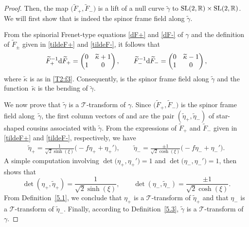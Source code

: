 \documentclass[pdftex]{sigma}
\numberwithin{equation}{section}
\def\bending{\kappa}
\def\R{\mathbb{R}}
\def\SL{{\rm SL}(2,\R)}
\begin{document}
\begin{proof}
	Then, the map $\bigl(\widetilde{F}_+,\widetilde{F}_-\bigr)$ is a lift of a null curve $\widetilde{\gamma}$ to $\SL\times\SL$. We will first show that  is indeed the spinor frame field along $\widetilde{\gamma}$.
	
	From the spinorial Frenet-type equations \eqref{dF+} and \eqref{dF-} of $\gamma$ and the definition of $\widetilde{F}_\pm$ given in \eqref{tildeF+} and \eqref{tildeF-}, it follows that
	\begin{gather*}
		\widetilde{F}_+^{-1}{\rm d}\widetilde{F}_+=\begin{pmatrix} 0 & \widetilde{\bending}+1 \\ 1 & 0 \end{pmatrix},\qquad
		\widetilde{F}_-^{-1}{\rm d}\widetilde{F}_-=\begin{pmatrix} 0 & \widetilde{\bending}-1 \\ 1 & 0 \end{pmatrix},
	\end{gather*}
	where $\widetilde{\bending}$ is as in \eqref{T2:f3}. Consequently,  is the spinor frame field along $\widetilde{\gamma}$ and the function~$\widetilde{\bending}$ is the bending of $\widetilde{\gamma}$.
	
	We now prove that $\widetilde{\gamma}$ is a $\mathcal{T}$-transform of $\gamma$. Since $\bigl(\widetilde{F}_+,\widetilde{F}_-\bigr)$ is the spinor frame field along~$\widetilde{\gamma}$, the first column vectors of  and  are the pair $(\widetilde{\eta}_+,\widetilde{\eta}_-)$ of star-shaped cousins associated with $\widetilde{\gamma}$. From the expressions of $\widetilde{F}_+$ and $\widetilde{F}_-$ given in \eqref{tildeF+} and \eqref{tildeF-}, respectively, we have
	\begin{gather*}
		\widetilde{\eta}_+=\frac{1}{\sqrt{2} \sinh(\xi)}\bigl(-f\eta_++\eta_+'\bigr),\qquad
		\widetilde{\eta}_-=\frac{\pm 1}{\sqrt{2} \cosh(\xi)}\bigl(-f\eta_-+\eta_-'\bigr).
	\end{gather*}
	A simple computation involving $\det \bigl(\eta_+,\eta_+'\bigr)=1$ and $\det \bigl(\eta_-,\eta_-'\bigr)=1$, then shows that
	\begin{equation*}
		\det (\eta_+,\widetilde{\eta}_+)=\frac{1}{\sqrt{2} \sinh(\xi)},\qquad \det (\eta_-,\widetilde{\eta}_-)=\frac{\pm 1}{\sqrt{2} \cosh(\xi)}.
	\end{equation*}
	From Definition~\ref{5.1}, we conclude that $\eta_+$ is a $\mathcal{T}$-transform of $\widetilde{\eta}_+$ and that $\eta_-$ is a $\mathcal{T}$-transform of $\widetilde{\eta}_-$. Finally, according to Definition~\ref{5.3}, $\widetilde{\gamma}$ is a $\mathcal{T}$-transform of $\gamma$.
\end{proof}
\end{document}
